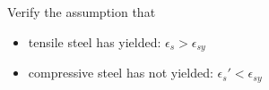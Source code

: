 Verify the assumption that
\begin{itemize}
\item tensile steel has yielded: $\epsilon_{s} > \epsilon_{sy}$
\item compressive steel has not yielded: $\epsilon_{s}' < \epsilon_{sy}$
\end{itemize}